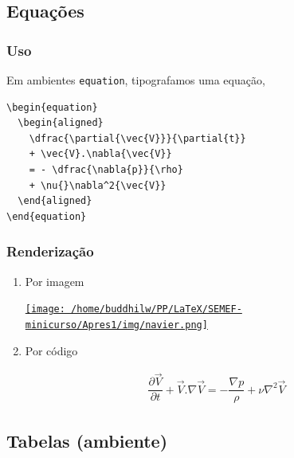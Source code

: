 \documentclass[11pt]{article}
\begin{document}
\subsection{Equações}
\label{sec:org9d2f5be}
\subsubsection{Uso}
\label{sec:org7756a93}
Em ambientes \texttt{equation}, tipografamos uma equação,
\begin{verbatim}
\begin{equation}
  \begin{aligned}
    \dfrac{\partial{\vec{V}}}{\partial{t}}
    + \vec{V}.\nabla{\vec{V}}
    = - \dfrac{\nabla{p}}{\rho}
    + \nu{}\nabla^2{\vec{V}}
  \end{aligned}
\end{equation}
\end{verbatim}

\subsubsection{Renderização}
\label{sec:orgbec415c}

\begin{enumerate}
\item Por imagem
\label{sec:org8a66c46}

\href{img/navier.png}{\texttt{[image: /home/buddhilw/PP/LaTeX/SEMEF-minicurso/Apres1/img/navier.png]}}

\item Por código
\label{sec:orgd82fc8b}

\begin{equation}
  \begin{aligned}
    \dfrac{\partial{\vec{V}}}{\partial{t}}
    + \vec{V}.\nabla{\vec{V}}
    = - \dfrac{\nabla{p}}{\rho}
    + \nu{}\nabla^2{\vec{V}}
  \end{aligned}
\end{equation}
\end{enumerate}
\subsection{Tabelas (ambiente)}
\label{sec:org3a38ea6}
\end{document}
